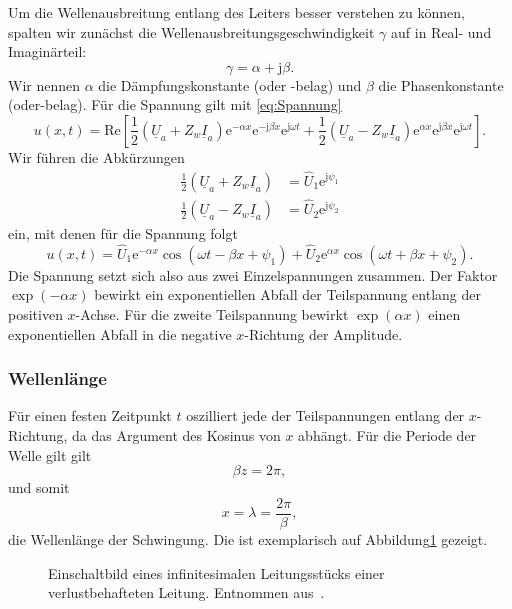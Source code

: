 \documentclass[paper=a4, parskip=half-, ngerman, fontsize=11pt]{scrreprt}
\begin{document}
Um die Wellenausbreitung entlang des Leiters besser verstehen zu können, spalten wir zunächst die
Wellenausbreitungsgeschwindigkeit $\gamma$ auf in Real- und Imaginärteil:
\[ \gamma = \alpha + \mathrm{j} \beta. \] Wir nennen $\alpha$ die Dämpfungskonstante (oder -belag) und $\beta$ die
Phasenkonstante (oder-belag). Für die Spannung gilt mit \eqref{eq:Spannung}
\begin{equation}
u(x, t) = \mathrm{Re} \left[
\frac{1}{2} \left( \underline{U}_{a} + Z_{w} \underline{I}_{a} \right) \mathrm{e}^{- \alpha x}
\mathrm{e}^{- \mathrm{j} \beta x} \mathrm{e}^{\mathrm{j} \omega t}
+
\frac{1}{2} \left( \underline{U}_{a} - Z_{w} \underline{I}_{a} \right) \mathrm{e}^{\alpha x}
\mathrm{e}^{\mathrm{j} \beta x} \mathrm{e}^{\mathrm{j} \omega t}
\right].
\end{equation}
Wir führen die Abkürzungen
\begin{align*}
\frac{1}{2} \left( \underline{U}_{a} + Z_{w} \underline{I}_{a} \right) &= \hat{U}_{1} \mathrm{e}^{\mathrm{j} \psi_{1}}
\\[1ex]
\frac{1}{2} \left( \underline{U}_{a} - Z_{w} \underline{I}_{a} \right) &= \hat{U}_{2} \mathrm{e}^{\mathrm{j} \psi_{2}}
\end{align*}
ein, mit denen für die Spannung folgt
\begin{equation}
u(x,t) =
\hat{U}_{1} \mathrm{e}^{- \alpha x} \cos \left( \omega t - \beta x + \psi_{1} \right)
+
\hat{U}_{2} \mathrm{e}^{\alpha x} \cos \left( \omega t + \beta x + \psi_{2} \right).
\end{equation}
Die Spannung setzt sich also aus zwei Einzelspannungen zusammen. Der Faktor $\exp(-\alpha x)$ bewirkt ein
exponentiellen Abfall der Teilspannung entlang der positiven $x$-Achse. Für die zweite Teilspannung bewirkt
$\exp(\alpha x)$ einen exponentiellen Abfall in die negative $x$-Richtung der Amplitude.

\subsubsection{Wellenlänge}

Für einen festen Zeitpunkt $t$ oszilliert jede der Teilspannungen entlang der $x$-Richtung, da das Argument des Kosinus
von $x$ abhängt. Für die Periode der Welle gilt gilt \[ \beta z = 2 \pi, \] und somit
\[ x = \lambda = \frac{2 \pi}{\beta}, \] die Wellenlänge der Schwingung. Die ist exemplarisch auf
Abbildung\ref{ExpWelle} gezeigt.
\begin{figure}[!htpb]
    \begin{center}
        
        \caption{Einschaltbild eines infinitesimalen Leitungsstücks einer verlustbehafteten Leitung. Entnommen
            aus~\cite{LeitungenUndFilter}.}
        \label{ExpWelle}
    \end{center}
\end{figure}
\end{document}

